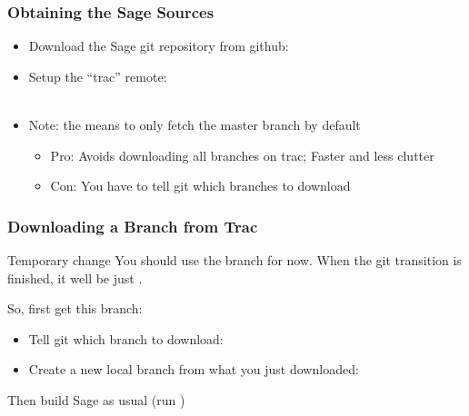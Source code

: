 \begin{frame}
  \frametitle{Obtaining the Sage Sources}
  
  \begin{itemize}
  \item 
    Download the Sage git repository from github:\\
  \item 
    Setup the ``trac'' remote:\\
    {
      \\
      \hfill
    }
  \item Note: the  means to only fetch the master
    branch by default 
    \begin{itemize}
    \item Pro: Avoids downloading all branches on trac; Faster and
      less clutter
    \item Con: You have to tell git which branches to download
    \end{itemize}
  \end{itemize}
\end{frame}




\begin{frame}
  \frametitle{Downloading a Branch from Trac}

   \begin{alertblock}{Temporary change}
     You should use the  branch for
     now. When the git transition is finished, it well be just
     .
   \end{alertblock}
   
   So, first get this branch:
   \begin{itemize}
   \item 
     Tell git which branch to download:\\
   \item 
     Create a new local branch from what you just downloaded:\\
   \end{itemize}

   Then build Sage as usual (run )
\end{frame}


